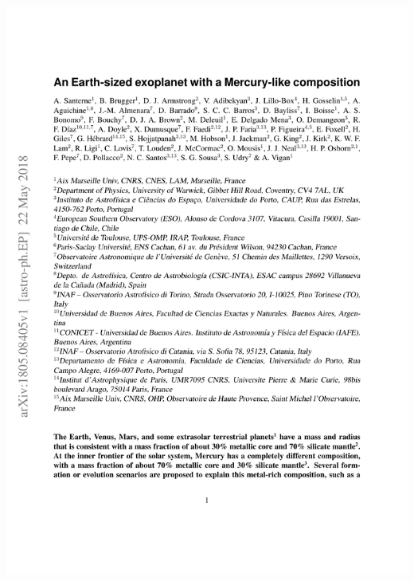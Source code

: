 {%
    {\includegraphics[width=.9\textwidth, keepaspectratio=true, page = 1, trim = 1.3cm 1cm 1.3cm 1cm, clip = true]{appendices/papers/Santerne2018_grey.pdf}}


}
